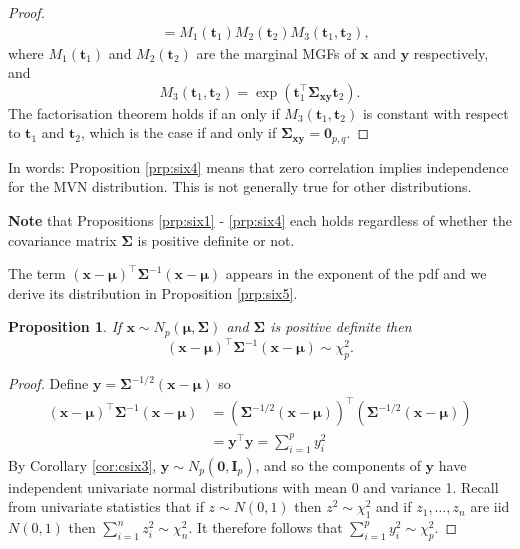 \documentclass[]{book}
\newtheorem{proposition}{Proposition}[chapter]
\theoremstyle{definition}
\theoremstyle{definition}
\theoremstyle{definition}
\theoremstyle{remark}
\begin{document}
\begin{proof}
\begin{align*}
&=M_1({\mathbf t}_1)M_2({\mathbf t}_2)M_3({\mathbf t}_1, {\mathbf t}_2),
\end{align*}
where \(M_1({\mathbf t}_1)\) and \(M_2({\mathbf t}_2)\) are the marginal MGFs of \(\boldsymbol x\) and \(\boldsymbol y\) respectively, and
\[
M_3({\mathbf t}_1, {\mathbf t}_2)=\exp\left ({\mathbf t}_1^\top \boldsymbol \Sigma_{\boldsymbol x\boldsymbol y}{\mathbf t}_2 \right ).
\]
The factorisation theorem holds if an only if \(M_3({\mathbf t}_1, {\mathbf t}_2)\) is constant with respect to
\({\mathbf t}_1\) and \({\mathbf t}_2\), which is the case if and only if \(\boldsymbol \Sigma_{\boldsymbol x\boldsymbol y}={\mathbf 0}_{p,q}\).
\end{proof}

In words: Proposition \ref{prp:six4} means that zero correlation implies independence for the MVN distribution. This is not generally true for other distributions.

\textbf{Note} that Propositions \ref{prp:six1} - \ref{prp:six4} each holds regardless of whether the covariance matrix \(\boldsymbol \Sigma\) is positive definite or not.

The term \((\boldsymbol x-\boldsymbol \mu)^\top \boldsymbol \Sigma^{-1} (\boldsymbol x-\boldsymbol \mu)\) appears in the exponent of the pdf and we derive its distribution in Proposition \ref{prp:six5}.

\begin{proposition}
\protect\hypertarget{prp:six5}{}{\label{prp:six5} }If \(\boldsymbol x\sim N_p(\boldsymbol \mu, \boldsymbol \Sigma)\) and \(\boldsymbol \Sigma\) is positive definite then
\[(\boldsymbol x-\boldsymbol \mu)^\top \boldsymbol \Sigma^{-1} (\boldsymbol x-\boldsymbol \mu) \sim \chi_p^2.\]
\end{proposition}

\begin{proof}
{}Define \(\boldsymbol y= \boldsymbol \Sigma^{-1/2} (\boldsymbol x-\boldsymbol \mu)\) so
\begin{align*}
(\boldsymbol x-\boldsymbol \mu)^\top \boldsymbol \Sigma^{-1} (\boldsymbol x-\boldsymbol \mu) &= \left(\boldsymbol \Sigma^{-1/2} (\boldsymbol x-\boldsymbol \mu) \right)^\top \left(\boldsymbol \Sigma^{-1/2} (\boldsymbol x-\boldsymbol \mu) \right)\\
&= \boldsymbol y^\top \boldsymbol y= \sum_{i=1}^p y_i^2
\end{align*}
By Corollary \ref{cor:csix3}, \(\boldsymbol y\sim N_p (\boldsymbol 0, \boldsymbol I_p)\), and so the components of \(\boldsymbol y\) have independent univariate normal distributions with mean 0 and variance 1. Recall from univariate statistics that if \(z \sim N(0,1)\) then \(z^2 \sim \chi^2_1\) and if \(z_1, \ldots, z_n\) are iid \(N(0,1)\) then \(\sum_{i=1}^n z_i^2 \sim \chi_n^2\). It therefore follows that \(\sum_{i=1}^p y_i^2 \sim \chi^2_p\).
\end{proof}
\end{document}
